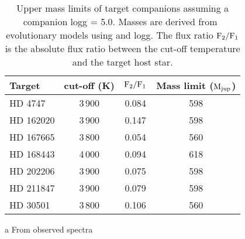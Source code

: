 \begin{table}
       \centering
  \begin{threeparttable}
     
       \caption{Upper mass limits of target companions assuming a companion logg = 5.0. Masses are derived from~\citet{baraffe_new_2015} evolutionary models using \teff{} and logg. The flux ratio \(\rm F_2/F_1\) is  the absolute flux ratio between the cut-off temperature and the target host star.}
      
        \begin{tabular}{l c c c}
            \toprule
            Target & \teff{} cut-off (K) & \(\rm F_2/F_1\) & Mass limit (\(\rm M_{jup}\))\\
            \midrule
            {HD 4747}     &  3\,900 & 0.084 & 598 \\ 
            {HD 162020} & 3\,900 & 0.147 & 598 \\
            {HD 167665} & 3\,800 & 0.054 & 560 \\
            {HD 168443} & 4\,000 & 0.094 & 618 \\
            {HD 202206} & 3\,900 & 0.075 & 598 \\
            {HD 211847} & 3\,900 & 0.079 & 598 \\
            {HD 30501}   & 3\,800\tnote{a} & 0.106 & 560 \\
            \bottomrule
        \end{tabular}
        \label{tab:mass_limits}
        \begin{tablenotes}[flushleft]
            \small
                \item [a] {From observed spectra }
        \end{tablenotes}
  \end{threeparttable}

\end{table}

